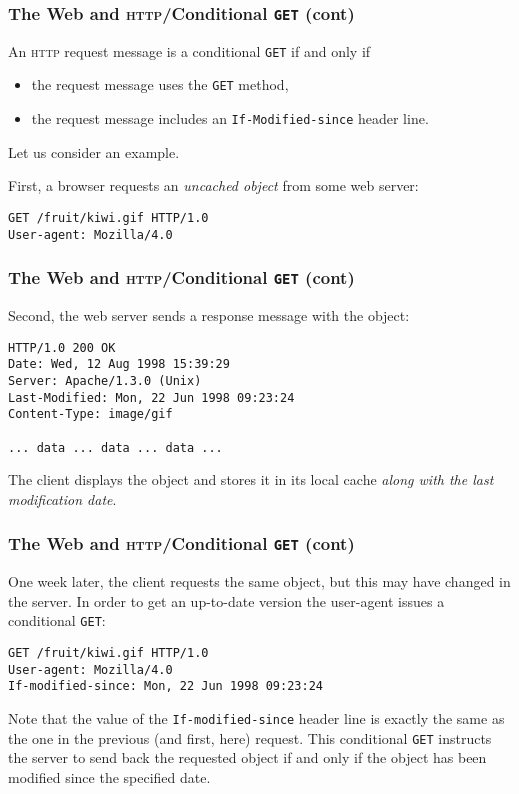 %
\begin{frame}[containsverbatim]
\frametitle{The Web and \textsc{http}/Conditional \texttt{GET} (cont)}

An \textsc{http} request message is a conditional \texttt{GET} if and
only if
\begin{itemize}

  \item the request message uses the \texttt{GET} method,

  \item the request message includes an \texttt{If-Modified-since}
  header line.

\end{itemize}

Let us consider an example.

\bigskip

First, a browser requests an \emph{uncached object} from some web
server:
{\small
\begin{verbatim}
GET /fruit/kiwi.gif HTTP/1.0
User-agent: Mozilla/4.0
\end{verbatim}
}

\end{frame}

%
\begin{frame}[containsverbatim]
\frametitle{The Web and \textsc{http}/Conditional \texttt{GET} (cont)}

Second, the web server sends a response message with the object:
{\small 
\begin{verbatim}
HTTP/1.0 200 OK
Date: Wed, 12 Aug 1998 15:39:29
Server: Apache/1.3.0 (Unix)
Last-Modified: Mon, 22 Jun 1998 09:23:24
Content-Type: image/gif

... data ... data ... data ...
\end{verbatim}
}
The client displays the object and stores it in its local cache
\emph{along with the last modification date}.

\end{frame}

%
\begin{frame}[containsverbatim]
\frametitle{The Web and \textsc{http}/Conditional \texttt{GET} (cont)}

One week later, the client requests the same object, but this may have
changed in the server. In order to get an up-to-date version the
user-agent issues a conditional \texttt{GET}:
{\small
\begin{verbatim}
GET /fruit/kiwi.gif HTTP/1.0
User-agent: Mozilla/4.0
If-modified-since: Mon, 22 Jun 1998 09:23:24
\end{verbatim}
}
Note that the value of the \texttt{If-modified-since} header line is
exactly the same as the one in the previous (and first, here)
request. This conditional \texttt{GET} instructs the server to send
back the requested object if and only if the object has been modified
since the specified date.

\end{frame}

